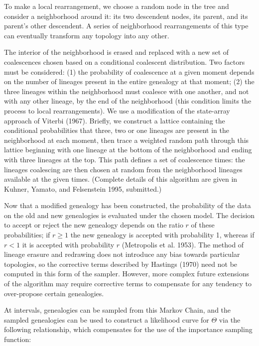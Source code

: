 To make a local rearrangement, we choose a random node in the tree and
consider a neighborhood around it:  its two descendent nodes, its parent,
and its parent's other descendent.  A series of neighborhood
rearrangements of this type can eventually transform any topology into
any other.

The interior of the neighborhood is erased and replaced with a new
set of coalescences chosen based on a conditional coalescent distribution.
Two factors must be considered:  (1) the probability of coalescence at a
given moment depends on the number of lineages present in the entire genealogy
at that moment; (2) the three lineages within the neighborhood must
coalesce with one another, and not with any other lineage, by the end of
the neighborhood (this condition limits the process to local
rearrangements). 
We use a modification of the state-array approach of
Viterbi (1967).  Briefly, we construct a lattice containing the
conditional probabilities that three, two or one lineages are present in
the neighborhood at each moment, then trace a weighted random path
through this lattice beginning with one lineage at the bottom of the 
neighborhood and ending with three lineages at the top.  This path
defines a set of coalescence times:  the lineages coalescing are then
chosen at random from the neighborhood lineages available at the given times.
(Complete details of this algorithm are given in Kuhner, Yamato, and
Felsenstein 1995, submitted.)

Now that a modified genealogy has been constructed, the probability of the
data on the old and new genealogies is evaluated under the chosen model.
The decision to accept or reject the new genealogy depends on
the ratio $r$ of these probabilities; if $r\geq 1$ the new genealogy is
accepted with probability 1, whereas if $r<1$ it is accepted with
probability $r$ (Metropolis et al. 1953).  The method of lineage erasure
and redrawing does not introduce any bias towards particular topologies,
so the corrective terms described by Hastings (1970) need not be
computed in this form of the sampler.  However, more complex future 
extensions of the
algorithm may require corrective terms to compensate for any tendency to
over-propose certain genealogies.

At intervals, genealogies can be sampled from this Markov Chain, and the
sampled genealogies can be used to construct a likelihood
curve for $\Theta$ via the following relationship, which compensates for
the use of the importance sampling function:

